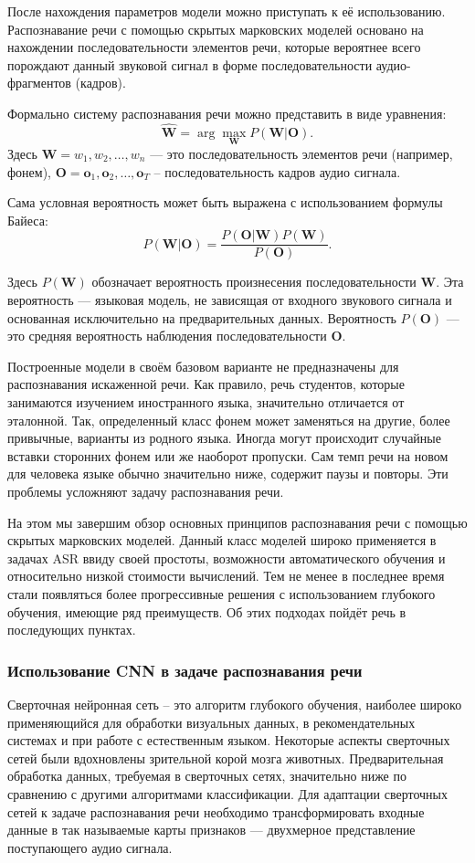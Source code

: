 После нахождения параметров модели можно приступать к её использованию. Распознавание речи с помощью скрытых марковских моделей основано на нахождении последовательности элементов речи, которые вероятнее всего порождают данный звуковой сигнал в форме последовательности аудио-фрагментов (кадров).

Формально систему распознавания речи можно представить в виде уравнения:
$$\mathbf{\hat{W}} = \operatorname{arg} \max_\mathbf{W} P(\mathbf{W} | \mathbf{O}).$$
Здесь $\mathbf{W} = w_1, w_2, \dots, w_n$ --- это последовательность элементов речи (например, фонем), $\mathbf{O} = \mathbf{o}_1, \mathbf{o}_2, \dots, \mathbf{o}_T$ -- последовательность кадров аудио сигнала.

Сама условная вероятность может быть выражена с использованием формулы Байеса:
$$P(\mathbf{W}|\mathbf{O}) = \frac{P(\mathbf{O}|\mathbf{W})P(\mathbf{W})}{P(\mathbf{O})}.$$

Здесь $P(\mathbf{W})$ обозначает вероятность произнесения последовательности $\mathbf{W}$. Эта вероятность --- языковая модель, не зависящая от входного звукового сигнала и основанная исключительно на предварительных данных. Вероятность $P(\mathbf{O})$ --- это средняя вероятность наблюдения последовательности $\mathbf{O}$.

Построенные модели в своём базовом варианте не предназначены для распознавания искаженной речи. Как правило, речь студентов, которые занимаются изучением иностранного языка, значительно отличается от эталонной. Так, определенный класс фонем может заменяться на другие, более привычные, варианты из родного языка. Иногда могут происходит случайные вставки сторонних фонем или же наоборот пропуски. Сам темп речи на новом для человека языке обычно значительно ниже, содержит паузы и повторы. Эти проблемы усложняют задачу распознавания речи.

На этом мы завершим обзор основных принципов распознавания речи с помощью скрытых марковских моделей. Данный класс моделей широко применяется в задачах ASR ввиду своей простоты, возможности автоматического обучения и относительно низкой стоимости вычислений. Тем не менее в последнее время стали появляться более прогрессивные решения с использованием глубокого обучения, имеющие ряд преимуществ. Об этих подходах пойдёт речь в последующих пунктах.

\subsubsection{Использование CNN в задаче распознавания речи}
Сверточная нейронная сеть -- это алгоритм глубокого обучения, наиболее широко применяющийся для обработки визуальных данных, в рекомендательных системах\cite{cnn-recomendation-system} и при работе с естественным языком\cite{cnn-nlp}. Некоторые аспекты сверточных сетей были вдохновлены зрительной корой мозга животных\cite{cnn-neocognitron}. Предварительная обработка данных, требуемая в сверточных сетях, значительно ниже по сравнению с другими алгоритмами классификации. Для адаптации сверточных сетей к задаче распознавания речи необходимо трансформировать входные данные в так называемые карты признаков --- двухмерное представление поступающего аудио сигнала.

